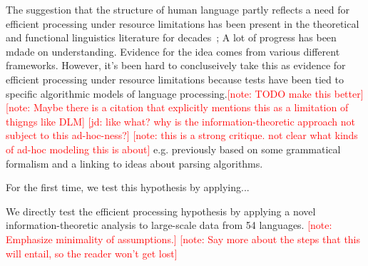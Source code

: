 \documentclass[12pt]{article}
\newcommand{\jd}[1]{\textcolor{Red}{[jd: #1]}}
\newcommand{\note}[1]{\textcolor{Red}{[note: #1]}}
\begin{document}
The suggestion that the structure of human language partly reflects a need for efficient processing under resource limitations has been present in the theoretical and functional linguistics literature for decades~\cite{berwick1984grammatical,hawkins1994performance};
A lot of progress has been mdade on understanding. Evidence for the idea comes from various different frameworks.
However, it's been hard to concluseively take this as evidence for efficient processing under resource limitations because tests have been tied to specific algorithmic models of language processing.\note{TODO make this better}
\note{Maybe there is a citation that explicitly mentions this as a limitation of  thigngs like DLM}
\jd{like what? why is the information-theoretic approach not subject to this ad-hoc-ness?}
\note{this is a strong critique. not clear what kinds of ad-hoc modeling this is about}
e.g. previously based on some grammatical formalism and a linking to ideas about parsing algorithms.

For the first time, we test this hypothesis by applying...

We directly test the efficient processing hypothesis by applying a novel information-theoretic analysis to large-scale data from 54 languages.
\note{Emphasize minimality of assumptions.}
\note{Say more about the steps that this will entail, so the reader won't get lost}




\end{document}
